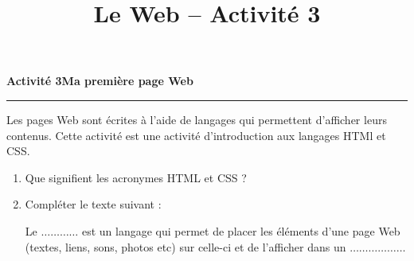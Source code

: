 \documentclass[a4paper]{article}
\begin{document}
\title{Le Web -- Activité 3}

\pagestyle{empty}

\date{}
\author{}

\maketitle{}

\thispagestyle{empty}
\noindent\textbf{Activité 3}\hfill{}\textbf{Ma première page Web}
\smallskip
\hrule
\medskip

Les pages Web sont écrites à l'aide de langages qui permettent d'afficher leurs contenus. Cette activité est une activité d'introduction aux langages HTMl et CSS.

\begin{enumerate}
  \item Que signifient les acronymes HTML et CSS ?
  \item Compléter le texte suivant :
    
    \medskip

    \og{}Le $\hdots\hdots\hdots\hdots$ est un langage qui permet de placer les éléments d'une page Web (textes, liens, sons, photos etc) sur celle-ci et de l'afficher dans un $\hdots\hdots\hdots\hdots\hdots\hdots$\fg{}

    \medskip


\end{enumerate}
\end{document}
